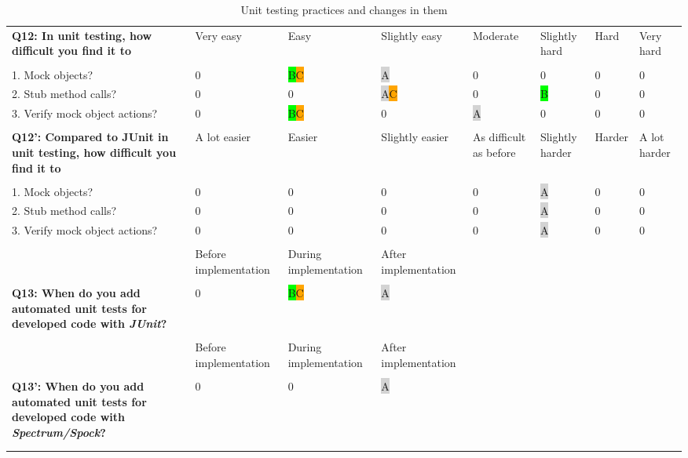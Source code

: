 \begin{table}[H]
{\begin{tabular}{p{13.0cm}*{7}{p{2cm}}}
            \textbf{Q12: In unit testing, how difficult you find it to} & Very easy & Easy & Slightly easy & Moderate & Slightly hard & Hard & Very hard \\
            & \\
            1. Mock objects? & 0 & {\colorbox{lime}B}{\colorbox{orange}C} & {\colorbox{lightgray}A} & 0 & 0 & 0 & 0 \\
            2. Stub method calls? & 0 & 0 & {\colorbox{lightgray}A}{\colorbox{orange}C} & 0 & {\colorbox{lime}B} & 0 & 0 \\
            3. Verify mock object actions? & 0 & {\colorbox{lime}B}{\colorbox{orange}C} & 0 & {\colorbox{lightgray}A} & 0 & 0 & 0 \\
            & \\ \hline
            \textbf{Q12': Compared to JUnit in unit testing, how difficult you find it to} & A lot easier & Easier & Slightly easier & As difficult as before & Slightly harder & Harder & A lot harder \\
            & \\
            1. Mock objects? & 0 & 0 & 0 & 0 & {\colorbox{lightgray}A} & 0 & 0 \\
            2. Stub method calls? & 0 & 0 & 0 & 0 & {\colorbox{lightgray}A} & 0 & 0 \\
            3. Verify mock object actions? & 0 & 0 & 0 & 0 & {\colorbox{lightgray}A} & 0 & 0 \\
            & \\ \hline

            & Before implementation & During implementation & After implementation & \\
            & \\
            \textbf{Q13: When do you add automated unit tests for developed code with \textit{JUnit}?} & 0 & {\colorbox{lime}B}{\colorbox{orange}C} & {\colorbox{lightgray}A} \\
            & \\ \hline
            & Before implementation & During implementation & After implementation & \\
            & \\
            \textbf{Q13': When do you add automated unit tests for developed code with \textit{Spectrum/Spock}?} & 0 & 0 & {\colorbox{lightgray}A} \\
            & \\ \hline
            & \\ \hline

            \end{tabular}}
            \caption {Unit testing practices and changes in them} \label{tab:junit-pt1}
    \end{table}
